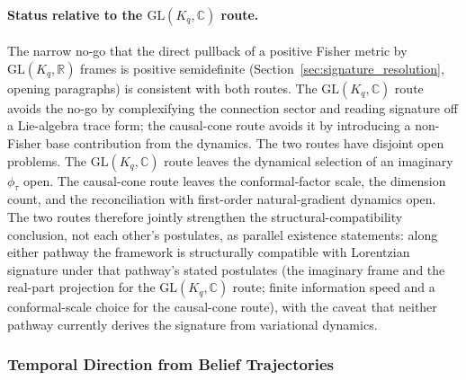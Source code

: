\documentclass[11pt]{article}
\begin{document}
\paragraph{Status relative to the $\mathrm{GL}(K_q,\mathbb{C})$ route.}
The narrow no-go that the direct pullback of a positive Fisher metric by $\mathrm{GL}(K_q,\mathbb{R})$ frames is positive semidefinite (Section~\ref{sec:signature_resolution}, opening paragraphs) is consistent with both routes. The $\mathrm{GL}(K_q,\mathbb{C})$ route avoids the no-go by complexifying the connection sector and reading signature off a Lie-algebra trace form; the causal-cone route avoids it by introducing a non-Fisher base contribution from the dynamics. The two routes have disjoint open problems. The $\mathrm{GL}(K_q,\mathbb{C})$ route leaves the dynamical selection of an imaginary $\phi_\tau$ open. The causal-cone route leaves the conformal-factor scale, the dimension count, and the reconciliation with first-order natural-gradient dynamics open. The two routes therefore jointly strengthen the structural-compatibility conclusion, not each other's postulates, as parallel existence statements: along either pathway the framework is structurally compatible with Lorentzian signature under that pathway's stated postulates (the imaginary frame and the real-part projection for the $\mathrm{GL}(K_q,\mathbb{C})$ route; finite information speed and a conformal-scale choice for the causal-cone route), with the caveat that neither pathway currently derives the signature from variational dynamics.

\subsubsection{Temporal Direction from Belief Trajectories}
\end{document}
